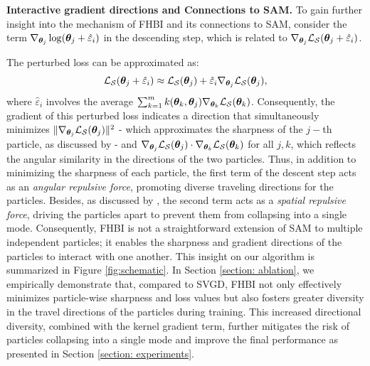 \textbf{Interactive gradient directions and Connections to SAM.} To gain further insight into the mechanism of FHBI and its connections to SAM, consider the term $\nabla_{{\bm{\theta}}_j}\log({\bm{\theta}}_j+\hat{\varepsilon}_i)$ in the descending step, which is related to $\nabla_{{\bm{\theta}}_j} {\mathcal{L}}_{\mathcal{S}}({\bm{\theta}}_j + \hat{\varepsilon}_i)$. 

The perturbed loss can be approximated as:
\begin{equation*}
{\mathcal{L}}_{\mathcal{S}}({\bm{\theta}}_j+\hat{\varepsilon}_i)\approx{\mathcal{L}}_{\mathcal{S}}({\bm{\theta}}_j) + \hat{\varepsilon}_i\nabla_{{\bm{\theta}}_j} {\mathcal{L}}_{\mathcal{S}}({\bm{\theta}}_j),
\end{equation*} 
 where $\hat{\varepsilon}_i$ involves the average $\sum_{k = 1}^m k({\bm{\theta}}_k, {\bm{\theta}}_j)\nabla_{{\bm{\theta}}_k} {\mathcal{L}}_{\mathcal{S}} ({\bm{\theta}}_k)$. Consequently, the gradient of this perturbed loss indicates a direction that simultaneously minimizes $\|\nabla_{{\bm{\theta}}_j} {\mathcal{L}}_{\mathcal{S}} ({\bm{\theta}}_j)\|^2$ - which approximates the sharpness of the $j-$th particle, as discussed by \citet{sam} - and $\nabla_{{\bm{\theta}}_j} {\mathcal{L}}_{\mathcal{S}} ({\bm{\theta}}_j) \cdot \nabla_{{\bm{\theta}}_k} {\mathcal{L}}_{\mathcal{S}} ({\bm{\theta}}_k)$ for all $j, k$, which reflects the angular similarity in the directions of the two particles. Thus, in addition to minimizing the sharpness of each particle, the first term of the descent step acts as an \textit{angular repulsive force}, promoting diverse traveling directions for the particles. Besides, as discussed by \citet{svgd}, the second term acts as a \textit{spatial repulsive force}, driving the particles apart to prevent them from collapsing into a single mode. Consequently, FHBI is not a straightforward extension of SAM to multiple independent particles; it enables the sharpness and gradient directions of the particles to interact with one another. This insight on our algorithm is summarized in Figure \ref{fig:schematic}. In Section \ref{section: ablation}, we empirically demonstrate that, compared to SVGD, FHBI not only effectively minimizes particle-wise sharpness and loss values but also fosters greater diversity in the travel directions of the particles during training. This increased directional diversity, combined with the kernel gradient term, further mitigates the risk of particles collapsing into a single mode and improve the final performance as presented in Section \ref{section: experiments}.